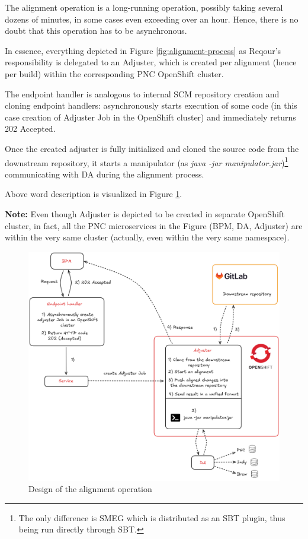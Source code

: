 \documentclass[../main.tex]{subfiles}
\begin{document}
The alignment operation is a long-running operation, possibly taking several dozens of minutes, in some cases even exceeding over an hour. Hence, there is no doubt that this operation has to be asynchronous.

In essence, everything depicted in Figure \ref{fig:alignment-process} as Reqour's responsibility is delegated to an Adjuster, which is created per alignment (hence per build) within the corresponding PNC OpenShift cluster.

The endpoint handler is analogous to internal SCM repository creation and cloning endpoint handlers: asynchronously starts execution of some code (in this case creation of Adjuster Job in the OpenShift cluster) and immediately returns 202 Accepted.

Once the created adjuster is fully initialized and cloned the source code from the downstream repository, it starts a manipulator (as \textit{java -jar manipulator.jar})\footnote{The only difference is SMEG which is distributed as an SBT plugin, thus being run directly through SBT.} communicating with DA during the alignment process.

Above word description is visualized in Figure \ref{fig:alignment-design}.

\textbf{Note:} Even though Adjuster is depicted to be created in separate OpenShift cluster, in fact, all the PNC microservices in the Figure (BPM, DA, Adjuster) are within the very same cluster (actually, even within the very same namespace).

\begin{figure}
  \begin{center}
    \includegraphics[width=\textwidth]{images/alignment-design.png}
  \end{center}
  \caption{Design of the alignment operation}
  \label{fig:alignment-design}
\end{figure}
\end{document}

